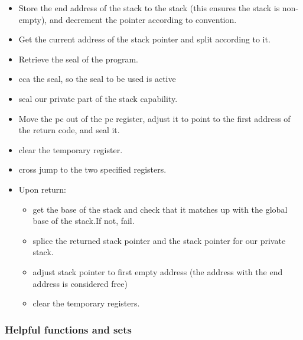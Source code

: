 \documentclass[a3paper]{article}
\begin{document}
\begin{itemize}
\item Store the end address of the stack to the stack (this ensures the stack is non-empty), and decrement the pointer according to convention.
\item Get the current address of the stack pointer and split according to it.
\item Retrieve the seal of the program.
\item cca the seal, so the seal to be used is active 
\item seal our private part of the stack capability.
\item Move the pc out of the pc register, adjust it to point to the first address of the return code, and seal it.
\item clear the temporary register.
\item cross jump to the two specified registers.
\item Upon return:
  \begin{itemize}
  \item get the base of the stack and check that it matches up with the global base of the stack.If not, fail.
  \item splice the returned stack pointer and the stack pointer for our private stack.
  \item adjust stack pointer to first empty address (the address with the end address is considered free)  
  \item clear the temporary registers.
  \end{itemize}
\end{itemize}

\subsubsection{Helpful functions and sets}
\end{document}
